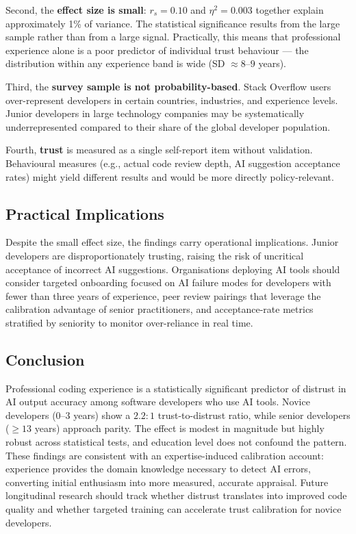 \documentclass[11pt,a4paper]{article}
\begin{document}
Second, the \textbf{effect size is small}: $r_s = 0.10$ and $\eta^2 = 0.003$ together
explain approximately 1\% of variance. The statistical significance results from the
large sample rather than from a large signal. Practically, this means that professional
experience alone is a poor predictor of individual trust behaviour --- the distribution
within any experience band is wide (SD $\approx 8$--$9$ years).

Third, the \textbf{survey sample is not probability-based}. Stack Overflow users over-represent
developers in certain countries, industries, and experience levels. Junior developers in
large technology companies may be systematically underrepresented compared to their share
of the global developer population.

Fourth, \textbf{trust} is measured as a single self-report item without validation.
Behavioural measures (e.g., actual code review depth, AI suggestion acceptance rates) might
yield different results and would be more directly policy-relevant.

\subsection{Practical Implications}

Despite the small effect size, the findings carry operational implications. Junior
developers are disproportionately trusting, raising the risk of uncritical acceptance
of incorrect AI suggestions. Organisations deploying AI tools should consider targeted
onboarding focused on AI failure modes for developers with fewer than three years of
experience, peer review pairings that leverage the calibration advantage of senior
practitioners, and acceptance-rate metrics stratified by seniority to monitor
over-reliance in real time.

\subsection{Conclusion}

Professional coding experience is a statistically significant predictor of distrust in
AI output accuracy among software developers who use AI tools. Novice developers (0--3 years)
show a $2.2:1$ trust-to-distrust ratio, while senior developers ($\geq 13$ years) approach
parity. The effect is modest in magnitude but highly robust across statistical tests, and
education level does not confound the pattern. These findings are consistent with an
expertise-induced calibration account: experience provides the domain knowledge necessary
to detect AI errors, converting initial enthusiasm into more measured, accurate appraisal.
Future longitudinal research should track whether distrust translates into improved code
quality and whether targeted training can accelerate trust calibration for novice developers.
\end{document}
